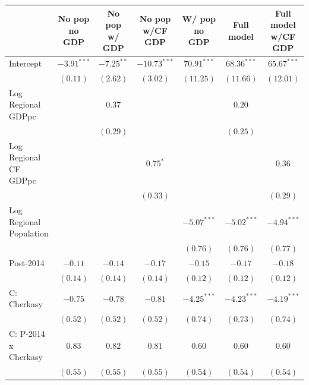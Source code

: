 
\begin{table}
\begin{center}
\begin{small}
\begin{tabular}{l c c c c c c}
\hline
 & No pop
no GDP & No pop
w/ GDP & No pop 
w/CF GDP & W/ pop
no GDP & Full model & Full model w/CF GDP \\
\hline
Intercept                   & $-3.91^{***}$ & $-7.25^{**}$  & $-10.73^{***}$ & $70.91^{***}$ & $68.36^{***}$ & $65.67^{***}$ \\
                            & $(0.11)$      & $(2.62)$      & $(3.02)$       & $(11.25)$     & $(11.66)$     & $(12.01)$     \\
Log Regional GDPpc          &               & $0.37$        &                &               & $0.20$        &               \\
                            &               & $(0.29)$      &                &               & $(0.25)$      &               \\
Log Regional CF GDPpc       &               &               & $0.75^{*}$     &               &               & $0.36$        \\
                            &               &               & $(0.33)$       &               &               & $(0.29)$      \\
Log Regional Population     &               &               &                & $-5.07^{***}$ & $-5.02^{***}$ & $-4.94^{***}$ \\
                            &               &               &                & $(0.76)$      & $(0.76)$      & $(0.77)$      \\
Post-2014                   & $-0.11$       & $-0.14$       & $-0.17$        & $-0.15$       & $-0.17$       & $-0.18$       \\
                            & $(0.14)$      & $(0.14)$      & $(0.14)$       & $(0.12)$      & $(0.12)$      & $(0.12)$      \\
C: Cherkasy                 & $-0.75$       & $-0.78$       & $-0.81$        & $-4.25^{***}$ & $-4.23^{***}$ & $-4.19^{***}$ \\
                            & $(0.52)$      & $(0.52)$      & $(0.52)$       & $(0.74)$      & $(0.73)$      & $(0.74)$      \\
C: P-2014 x Cherkasy        & $0.83$        & $0.82$        & $0.81$         & $0.60$        & $0.60$        & $0.60$        \\
                            & $(0.55)$      & $(0.55)$      & $(0.55)$       & $(0.54)$      & $(0.54)$      & $(0.54)$      \\

\end{tabular}
\end{small}
\end{center}
\end{table}

